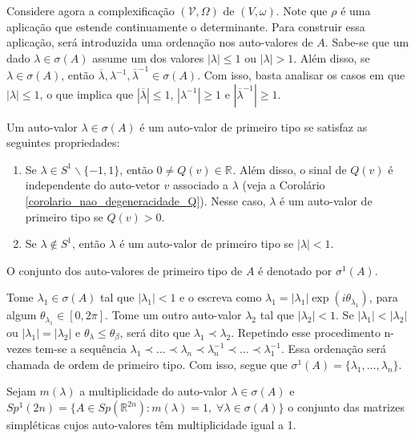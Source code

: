\documentclass[12pt]{book}
\newcommand{\autovalorprimeirotipo}[1]{\sigma^{1}(#1)}
\newcommand{\circulo}{S^{1}}
\newcommand{\complexificado}[1]{\mathcal{#1}}
\newcommand{\espectrooperador}[1]{\sigma(#1)}
\newcommand{\gruposimpletico}[1]{Sp(#1)}
\newcommand{\gruposimpleticoespecial}[1]{Sp^{1}(#1)}
\newcommand{\real}[1]{\mathbb{R}^{#1}}
\newcommand{\reta}{\real{}}
\begin{document}
	Considere agora a complexificação $(\complexificado{V}, \Omega)$ de $(V, \omega)$. Note que $\rho$ é uma aplicação que estende continuamente o determinante. Para construir essa aplicação, será introduzida uma ordenação nos auto-valores de $A$. Sabe-se que um dado $\lambda \in \espectrooperador{A}$ assume um dos valores $|\lambda|\leq 1$ ou $|\lambda|>1$. Além disso, se $\lambda \in \espectrooperador{A}$, então $\overline{\lambda}, \lambda^{-1}, \overline{\lambda}^{-1} \in \espectrooperador{A}$. Com isso, basta analisar os casos em que $|\lambda| \leq 1$, o que implica que $|\overline{\lambda}|\leq 1$, $|\lambda^{-1}|\geq 1$ e $|\overline{\lambda}^{-1}|\geq 1$.
	
	Um auto-valor $\lambda \in \espectrooperador{A}$ é um auto-valor de primeiro tipo se satisfaz as seguintes propriedades: 
	\begin{enumerate}
		\item Se $\lambda \in \circulo\backslash\{-1,1\}$, então $0\neq Q(v)\in \reta$. Além disso, o sinal de $Q(v)$ é independente do auto-vetor $v$ associado a $\lambda$ (veja a Corolário \ref{corolario_nao_degeneracidade_Q}). Nesse caso, $\lambda$ é um auto-valor de primeiro tipo se $Q(v)>0$.
		
		\item Se $\lambda\notin \circulo$, então $\lambda$ é um auto-valor de primeiro tipo se $|\lambda|<1$.
	\end{enumerate}
	
	O conjunto dos auto-valores de primeiro tipo de $A$ é denotado por $\autovalorprimeirotipo{A}$. 
	
	Tome $\lambda_{1}\in \sigma(A)$ tal que $|\lambda_{1}|<1$ e o escreva como $\lambda_{1} = |\lambda_{1}|\exp(i\theta_{\lambda_{1}})$, para algum $\theta_{\lambda_{1}} \in [0,2\pi]$. Tome um outro auto-valor $\lambda_{2}$ tal que $|\lambda_{2}|<1$. Se $|\lambda_{1}| < |\lambda_{2}|$ ou  $|\lambda_{1}|= |\lambda_{2}|$ e $\theta_{\lambda} \leq \theta_{\beta}$, será dito que $\lambda_{1} \prec \lambda_{2}$. Repetindo esse procedimento n-vezes tem-se a sequência $\lambda_{1} \prec \dots \prec \lambda_{n} \prec  \lambda_{n}^{-1} \prec \dots \prec \lambda_{1}^{-1}$. Essa ordenação será chamada de ordem de primeiro tipo. Com isso, segue que $\autovalorprimeirotipo{A} = \{\lambda_{1} ,\dots, \lambda_{n} \}$.
	
	Sejam $m(\lambda)$ a multiplicidade do auto-valor $\lambda \in \espectrooperador{A}$  e $\gruposimpleticoespecial{2n} =\{A\in \gruposimpletico{\real{2n}} : m(\lambda) = 1,\;\forall \lambda\in \espectrooperador{A} \}$ o conjunto das matrizes simpléticas cujos auto-valores têm multiplicidade igual a 1.
	
\end{document}
